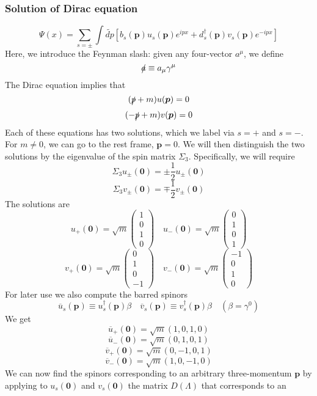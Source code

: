 \documentclass[cyan]{elegantnote}
\begin{document}
\subsubsection{Solution of Dirac equation}
\[\Psi(x) = \sum_{s = \pm} \int \widetilde{dp} \left[ b_s(\bm{p})u_s(\bm{p}) e^{ipx} + d^{\dagger}_s(\bm{p})v_s(\bm{p}) e^{-ipx}\right]\]
Here, we introduce the Feynman slash: given any four-vector $a^{\mu}$, we define
\[\slashed{a} \equiv a_{\mu} \gamma^{\mu}\]
The Dirac equation implies that
\[(\slashed{p}+m)u(\bm{p}) = 0\]
\[(-\slashed{p}+m)v(\bm{p}) = 0\]
Each of these equations has two solutions, which we label via $s=+$ and $s=-$. For $m \neq 0$, we can go to the rest frame, $\bm{p} = 0$. We will then distinguish the two solutions by the eigenvalue of the spin matrix $\Sigma_3$. Specifically, we will require
\[\Sigma_3 u_{\pm}(\bm{0}) = \pm \frac{1}{2} u_{\pm}(\bm{0})\]
\[\Sigma_3 v_{\pm}(\bm{0}) = \mp \frac{1}{2} v_{\pm}(\bm{0})\]
The solutions are
\[u_{+}(\bm{0}) = \sqrt{m} \left( \begin{matrix} 1\\ 0\\ 1 \\ 0\end{matrix} \right) \quad u_{-}(\bm{0}) = \sqrt{m} \left( \begin{matrix} 0\\ 1\\ 0 \\ 1\end{matrix} \right) \]
\[v_{+}(\bm{0}) = \sqrt{m} \left( \begin{matrix} 0\\ 1\\ 0 \\ -1\end{matrix} \right) \quad v_{-}(\bm{0}) = \sqrt{m} \left( \begin{matrix} -1\\ 0\\ 1 \\ 0\end{matrix} \right) \]
For later use we also compute the barred spinors
\[\overline{u}_s(\bm{p}) \equiv u^{\dagger}_s(\bm{p})\beta \quad \overline{v}_s(\bm{p}) \equiv v^{\dagger}_s(\bm{p})\beta \quad (\beta = \gamma^0)\]
We get
\[\overline{u}_{+}(\bm{0}) = \sqrt{m} (1,0,1,0)\]
\[\overline{u}_{-}(\bm{0}) = \sqrt{m} (0,1,0,1)\]
\[\overline{v}_{+}(\bm{0}) = \sqrt{m} (0,-1,0,1)\]
\[\overline{v}_{-}(\bm{0}) = \sqrt{m} (1,0,-1,0)\]
We can now find the spinors corresponding to an arbitrary three-momentum $\bm{p}$ by applying to $u_s(\bm{0})$ and $v_s(\bm{0})$ the matrix $D(\Lambda)$ that corresponds to an
\end{document}
